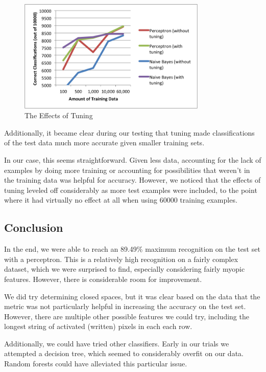 \documentclass{article}
\theoremstyle{remark}
\begin{document}
    \begin{figure}[h!]
      \centering
      \includegraphics[width=0.8\textwidth]{../graphs/tuning.png}
      \caption{The Effects of Tuning}
    \end{figure}
    \newpage
    Additionally, it became clear during our testing that tuning made classifications of the test data much more accurate given smaller training sets.

    In our case, this seems straightforward. Given less data, accounting for the lack of examples by doing more training or accounting for possibilities that weren't in the training data was helpful for accuracy. However, we noticed that the effects of tuning leveled off considerably as more test examples were included, to the point where it had virtually no effect at all when using 60000 training examples.
     \subsection*{Conclusion}
     In the end, we were able to reach an 89.49\% maximum recognition on the test set with a perceptron. This is a relatively high recognition on a fairly complex dataset, which we were surprised to find, especially considering fairly myopic features. However, there is considerable room for improvement.

     We did try determining closed spaces, but it was clear based on the data that the metric was not particularly helpful in increasing the accuracy on the test set. However, there are multiple other possible features we could try, including the longest string of activated (written) pixels in each each row.

     Additionally, we could have tried other classifiers. Early in our trials we attempted a decision tree, which seemed to considerably overfit on our data. Random forests could have alleviated this particular issue.
\end{document}
